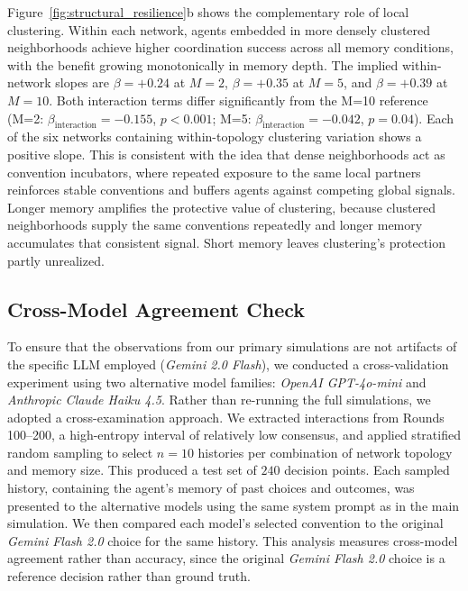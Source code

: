 \documentclass{article}
\begin{document}
Figure~\ref{fig:structural_resilience}b shows the complementary role of local clustering. Within each network, agents embedded in more densely clustered neighborhoods achieve higher coordination success across all memory conditions, with the benefit growing monotonically in memory depth. The implied within-network slopes are $\beta = +0.24$ at $M = 2$, $\beta = +0.35$ at $M = 5$, and $\beta = +0.39$ at $M = 10$. Both interaction terms differ significantly from the M=10 reference (M=2: $\beta_{\text{interaction}} = -0.155$, $p < 0.001$; M=5: $\beta_{\text{interaction}} = -0.042$, $p = 0.04$). Each of the six networks containing within-topology clustering variation shows a positive slope. This is consistent with the idea that dense neighborhoods act as convention incubators, where repeated exposure to the same local partners reinforces stable conventions and buffers agents against competing global signals. Longer memory amplifies the protective value of clustering, because clustered neighborhoods supply the same conventions repeatedly and longer memory accumulates that consistent signal. Short memory leaves clustering's protection partly unrealized.

\subsection{Cross-Model Agreement Check}
\label{sec:crossmodel}

To ensure that the observations from our primary simulations are not artifacts of the specific LLM employed (\textit{Gemini 2.0 Flash}), we conducted a cross-validation experiment using two alternative model families: \textit{OpenAI GPT-4o-mini} and \textit{Anthropic Claude Haiku 4.5}. Rather than re-running the full simulations, we adopted a cross-examination approach. We extracted interactions from Rounds 100--200, a high-entropy interval of relatively low consensus, and applied stratified random sampling to select $n=10$ histories per combination of network topology and memory size. This produced a test set of $240$ decision points. Each sampled history, containing the agent's memory of past choices and outcomes, was presented to the alternative models using the same system prompt as in the main simulation. We then compared each model's selected convention to the original \textit{Gemini Flash 2.0} choice for the same history. This analysis measures cross-model agreement rather than accuracy, since the original \textit{Gemini Flash 2.0} choice is a reference decision rather than ground truth.
\end{document}

